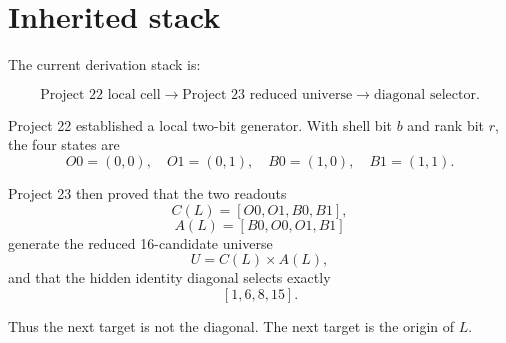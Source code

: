 \section{Inherited stack}

The current derivation stack is:

\[
\text{Project 22 local cell}
    \longrightarrow
\text{Project 23 reduced universe}
    \longrightarrow
\text{diagonal selector}.
\]

Project 22 established a local two-bit generator.  With shell bit \(b\) and rank bit \(r\), the four states are
\[
    O0=(0,0),\quad O1=(0,1),\quad B0=(1,0),\quad B1=(1,1).
\]

Project 23 then proved that the two readouts
\[
    C(L)=[O0,O1,B0,B1],
\]
\[
    A(L)=[B0,O0,O1,B1]
\]
generate the reduced 16-candidate universe
\[
    U=C(L)\times A(L),
\]
and that the hidden identity diagonal selects exactly
\[
    [1,6,8,15].
\]

Thus the next target is not the diagonal.  The next target is the origin of \(L\).
